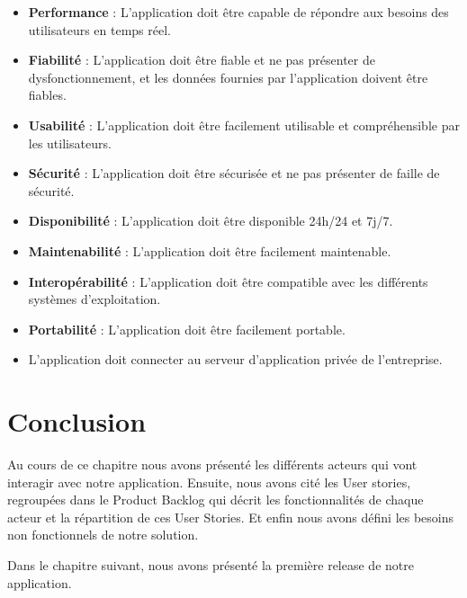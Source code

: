 \begin{itemize}
\item \textbf{Performance} : L'application doit être capable de répondre aux besoins des utilisateurs en temps réel.
\item \textbf{Fiabilité} : L'application doit être fiable et ne pas présenter de dysfonctionnement, et les données fournies par l'application doivent être fiables.
\item \textbf{Usabilité} : L'application doit être facilement utilisable et compréhensible par les utilisateurs.
\item \textbf{Sécurité} : L'application doit être sécurisée et ne pas présenter de faille de sécurité.
\item \textbf{Disponibilité} : L'application doit être disponible 24h/24 et 7j/7.
\item \textbf{Maintenabilité} : L'application doit être facilement maintenable.
\item \textbf{Interopérabilité} : L'application doit être compatible avec les différents systèmes d'exploitation.
\item \textbf{Portabilité} : L'application doit être facilement portable.
\item L'application doit connecter au serveur d'application privée de l'entreprise.
\end{itemize}

\section*{Conclusion}
Au cours de ce chapitre nous avons présenté les différents acteurs qui vont interagir avec notre application. Ensuite, nous avons cité les User stories, regroupées dans le Product Backlog qui décrit les fonctionnalités de chaque acteur et la répartition de ces User Stories. Et enfin nous avons défini les besoins non fonctionnels de notre solution.

Dans le chapitre suivant, nous avons présenté la première release de notre application.